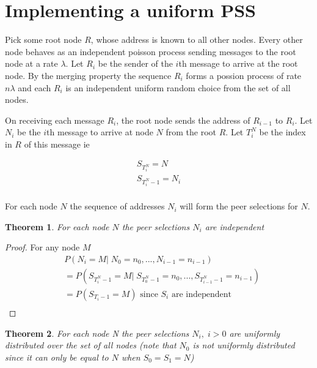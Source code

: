 \documentclass[a4paper,10pt]{article}
\date{2010-08-23}
\newtheorem*{thm}{Theorem}
\begin{document}
\section{Implementing a uniform PSS}

Pick some root node $R$, whose address is known to all other nodes. Every other node behaves as an independent poisson process sending messages to the root node at a rate $\lambda$. Let $R_i$ be the sender of the $i$th message to arrive at the root node. By the merging property the sequence $R_i$ forms a possion process of rate $n \lambda$ and each $R_i$ is an independent uniform random choice from the set of all nodes.

On receiving each message $R_i$, the root node sends the address of $R_{i-1}$ to $R_i$. Let $N_i$ be the $i$th message to arrive at node $N$ from the root $R$. Let $T^N_i$ be the index in $R$ of this message ie

\begin{gather*}
S_{T^N_i} = N \\
S_{T^N_i-1} = N_i \\
\end{gather*}

For each node $N$ the sequence of addresses $N_i$ will form the peer selections for $N$.

\begin{thm}For each node $N$ the peer selections $N_i$ are independent\end{thm}

\begin{proof}
For any node $M$
\begin{align*}
& \!\!\! P(N_i = M |\; N_0=n_0, ... ,N_{i-1} = n_{i-1}) \\
& = P(S_{T^N_i-1} = M |\; S_{T^N_0-1} = n_0, ... ,S_{T^N_{i-1}-1} = n_{i-1}) \\
& = P(S_{T_i-1} = M) \text{ since $S_i$ are independent} \\
\end{align*}
\end{proof}

\begin{thm}For each node N the peer selections $N_i, \; i>0$ are uniformly distributed over the set of all nodes (note that $N_0$ is not uniformly distributed since it can only be equal to $N$ when $S_0 = S_1 = N$)\end{thm}
\end{document}
